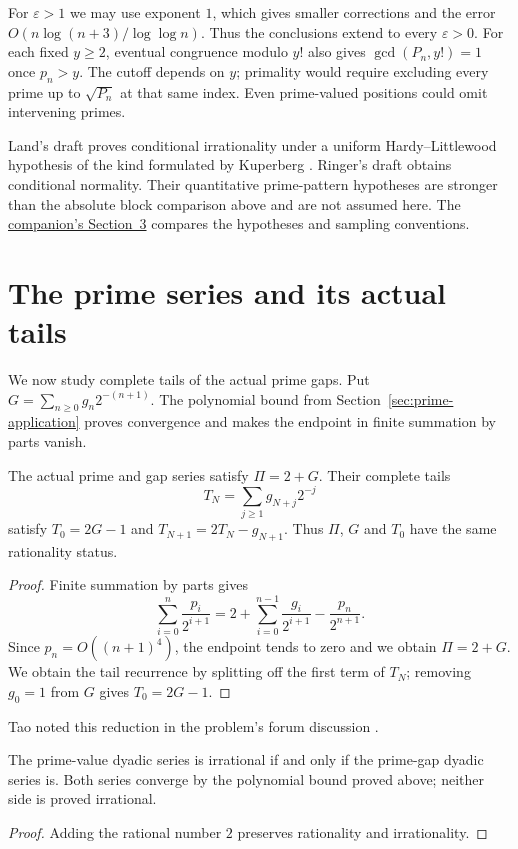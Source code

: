 \documentclass[11pt]{article}
\begin{document}
For $\varepsilon>1$ we may use exponent $1$, which gives smaller
corrections and the error $O(n\log(n+3)/\log\log n)$.  Thus the conclusions
extend to every $\varepsilon>0$.  For each fixed $y\ge2$, eventual
congruence modulo $y!$ also gives $\gcd(P_n,y!)=1$ once $p_n>y$.
The cutoff depends on $y$; primality would require excluding every
prime up to $\sqrt{P_n}$ at that same index.  Even prime-valued positions
could omit intervening primes.

Land's draft \cite[Theorem~2]{land2026} proves conditional irrationality
under a uniform Hardy--Littlewood hypothesis of the kind formulated by
Kuperberg \cite[Conjecture~1.3]{kuperberg2023}.  Ringer's draft
\cite{ringer2026} obtains conditional normality.  Their quantitative
prime-pattern hypotheses are stronger than the absolute block comparison
above and are not assumed here.  The
\href{erdos251-prime-gap-reasoning-surface.pdf\#context}{companion's Section~3}
compares the hypotheses and sampling conventions.

\section{The prime series and its actual tails}\label{sec:parts}
We now study complete tails of the actual prime gaps.  Put
$G=\sum_{n\ge0}g_n2^{-(n+1)}$.  The polynomial bound from
Section~\ref{sec:prime-application} proves convergence and makes the
endpoint in finite summation by parts vanish.

\begin{theorem}\label{res:infinite}
The actual prime and gap series satisfy $\Pi=2+G$.  Their complete tails
\[
 T_N=\sum_{j\ge1}g_{N+j}2^{-j}
\]
satisfy $T_0=2G-1$ and $T_{N+1}=2T_N-g_{N+1}$.
Thus $\Pi$, $G$ and $T_0$ have the same rationality status.
\end{theorem}
\begin{proof}
Finite summation by parts gives
\[
 \sum_{i=0}^{n}\frac{p_i}{2^{i+1}}
 =2+\sum_{i=0}^{n-1}\frac{g_i}{2^{i+1}}-\frac{p_n}{2^{n+1}}.
\]
Since $p_n=O((n+1)^4)$, the endpoint tends to zero and we obtain
$\Pi=2+G$.  We obtain the tail recurrence by splitting off the first
term of $T_N$; removing $g_0=1$ from $G$ gives $T_0=2G-1$.
\end{proof}
Tao noted this reduction in the problem's forum discussion
\cite[7 October 2025]{erdosproblems251thread}.

\begin{corollary}\label{res:irr-equivalence}
The prime-value dyadic series is irrational if and only if the prime-gap
dyadic series is. Both series converge by the polynomial bound proved above;
neither side is proved irrational.
\end{corollary}
\begin{proof}
Adding the rational number $2$ preserves rationality and irrationality.
\end{proof}
\end{document}
